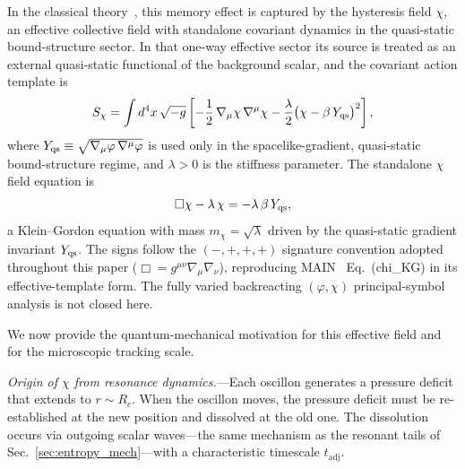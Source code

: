 \documentclass[aps,prd,onecolumn,superscriptaddress,nofootinbib,showpacs,12pt,notitlepage]{revtex4-2}
\begin{document}
In the classical theory~\cite{Lotishvili2026}, this
memory effect is captured by the hysteresis field $\chi$,
an effective collective field with standalone covariant dynamics in
the quasi-static bound-structure sector.  In that one-way effective
sector its source is treated as an external quasi-static functional
of the background scalar, and the covariant action template is
\begin{equation}\label{eq:S_chi_quantum}
  S_\chi = \int d^4x\,\sqrt{-g}\left[
    -\frac{1}{2}\,\nabla_\mu\chi\,\nabla^\mu\chi
    - \frac{\lambda}{2}\bigl(\chi - \beta\,Y_{\rm qs}\bigr)^2
  \right],
\end{equation}
where
$Y_{\rm qs} \equiv \sqrt{\nabla_\mu\varphi\,\nabla^\mu\varphi}$
is used only in the spacelike-gradient, quasi-static
bound-structure regime, and $\lambda > 0$ is the stiffness
parameter.  The standalone $\chi$
field equation is
\begin{equation}\label{eq:chi_kg_quantum}
  \Box\chi - \lambda\,\chi
  = -\lambda\,\beta\,Y_{\rm qs},
\end{equation}
a Klein--Gordon equation with mass $m_\chi = \sqrt{\lambda}$
driven by the quasi-static gradient invariant $Y_{\rm qs}$.  The signs follow
the $(-,+,+,+)$ signature convention adopted throughout
this paper ($\Box = g^{\mu\nu}\nabla_\mu\nabla_\nu$),
reproducing MAIN~\cite{Lotishvili2026} Eq.~(chi\_KG)
in its effective-template form.  The fully varied backreacting
$(\varphi,\chi)$ principal-symbol analysis is not closed here.

We now provide the quantum-mechanical motivation
for this effective field and for the microscopic tracking scale.

\textit{Origin of $\chi$ from resonance dynamics.}---Each
oscillon generates a pressure deficit that extends to
$r \sim R_c$.  When the oscillon moves, the pressure
deficit must be re-established at the new position and
dissolved at the old one.  The dissolution occurs via
outgoing scalar waves---the same mechanism as the
resonant tails of Sec.~\ref{sec:entropy_mech}---with
a characteristic timescale $t_{\mathrm{adj}}$.
\end{document}
